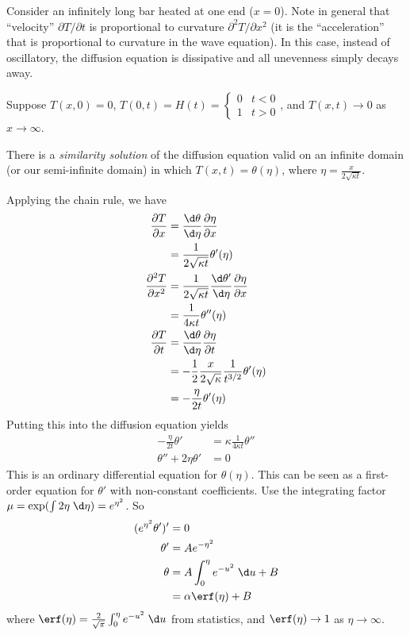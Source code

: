 \documentclass[a4paper]{article}
\begin{document}
    \begin{eg}
      Consider an infinitely long bar heated at one end ($x = 0$). Note in general that ``velocity'' $\partial T/\partial t$ is proportional to curvature $\partial^2 T/\partial x^2$ (it is the ``acceleration'' that is proportional to curvature in the wave equation). In this case, instead of oscillatory, the diffusion equation is dissipative and all unevenness simply decays away.

      Suppose $T(x,0) = 0$, $T(0, t) = H(t) = 
      \begin{cases}
        0 & t < 0\\
        1 & t > 0
      \end{cases}$, and $T(x, t)\to 0$ as $x\to \infty$.

      There is a \emph{similarity solution} of the diffusion equation valid on an infinite domain (or our semi-infinite domain) in which $T(x, t) = \theta(\eta)$, where $\displaystyle \eta = \frac{x}{2\sqrt{\kappa t}}$.

      Applying the chain rule, we have
      \begin{align*}
        \frac{\partial T}{\partial x} &= \frac{\d \theta}{\d \eta} \frac{\partial \eta}{\partial x}\\
        &= \frac{1}{2\sqrt{\kappa t}} \theta'(\eta)\\
        \frac{\partial^2 T}{\partial x^2} &= \frac{1}{2\sqrt{\kappa t}} \frac{\d\theta'}{\d\eta}\frac{\partial \eta}{\partial x}\\
        &= \frac{1}{4\kappa t}\theta''(\eta)\\
        \frac{\partial T}{\partial t} &= \frac{\d \theta}{\d \eta}\frac{\partial \eta}{\partial t}\\
        &= -\frac{1}{2}\frac{x}{2\sqrt{\kappa}}\frac{1}{t^{3/2}} \theta'(\eta)\\
        &= -\frac{\eta}{2t}\theta'(\eta)
      \end{align*}
      Putting this into the diffusion equation yields
      \begin{align*}
        -\frac{\eta}{2t}\theta' &= \kappa \frac{1}{4\kappa t}\theta''\\
        \theta'' + 2\eta\theta' &= 0
      \end{align*}
      This is an ordinary differential equation for $\theta(\eta)$. This can be seen as a first-order equation for $\theta'$ with non-constant coefficients. Use the integrating factor $\mu = \exp(\int 2\eta \;\d \eta) = e^{\eta^2}$. So
      \begin{align*}
        (e^{\eta^2}\theta')' &= 0\\
        \theta' &= Ae^{-\eta^2}\\
        \theta &= A\int_0^\eta e^{-u^2}\;\d u + B\\
        &= \alpha\erf(\eta) + B
      \end{align*}
      where $\erf(\eta) = \frac{2}{\sqrt{\pi}} \int_0^\eta e^{-u^2}\;\d u$ from statistics, and $\erf(\eta)\to 1$ as $\eta\to \infty$.


\end{eg}
\end{document}
